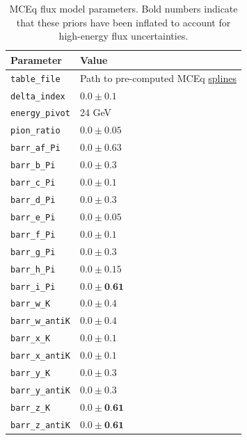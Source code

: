 \begin{table}
\caption{MCEq flux model parameters. Bold numbers indicate that these priors have been inflated to account for high-energy flux uncertainties.}
\label{table:mceq_cfg_params}
\begin{center}
\begin{tabular}{ |l|l| } 
\hline

\textbf{Parameter} & \textbf{Value} \\ \hline

\texttt{table\_file} & Path to pre-computed MCEq \href{https://github.com/IceCubeOpenSource/fridge/tree/master/analysis/common/data/flux}{splines} \\ \hline
\texttt{delta\_index} & $0.0 \pm 0.1$ \\ \hline
\texttt{energy\_pivot} & 24 GeV \\ \hline

\texttt{pion\_ratio} & $0.0 \pm 0.05$ \\ \hline
\texttt{barr\_af\_Pi} & $0.0 \pm 0.63$ \\ \hline
\texttt{barr\_b\_Pi} & $0.0 \pm 0.3$ \\ \hline
\texttt{barr\_c\_Pi} & $0.0 \pm 0.1$ \\ \hline
\texttt{barr\_d\_Pi} & $0.0 \pm 0.3$ \\ \hline
\texttt{barr\_e\_Pi} & $0.0 \pm 0.05$ \\ \hline
\texttt{barr\_f\_Pi} & $0.0 \pm 0.1$ \\ \hline
\texttt{barr\_g\_Pi} & $0.0 \pm 0.3$ \\ \hline
\texttt{barr\_h\_Pi} & $0.0 \pm 0.15$ \\ \hline
\texttt{barr\_i\_Pi} & $0.0 \pm \textbf{0.61}$ \\ \hline

\texttt{barr\_w\_K} &  $0.0 \pm 0.4$ \\ \hline
\texttt{barr\_w\_antiK} &  $0.0 \pm 0.4$ \\ \hline
\texttt{barr\_x\_K} &  $0.0 \pm 0.1$ \\ \hline
\texttt{barr\_x\_antiK} &  $0.0 \pm 0.1$ \\ \hline
\texttt{barr\_y\_K} &  $0.0 \pm 0.3$ \\ \hline
\texttt{barr\_y\_antiK} &  $0.0 \pm 0.3$ \\ \hline
\texttt{barr\_z\_K} &  $0.0 \pm \textbf{0.61}$ \\ \hline
\texttt{barr\_z\_antiK} &  $0.0 \pm \textbf{0.61}$ \\ \hline

\end{tabular}
\end{center}
\end{table}


